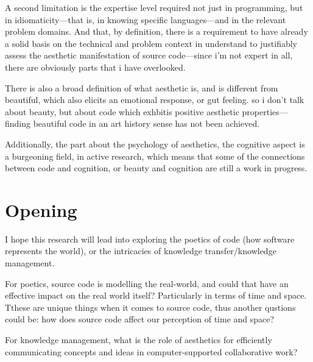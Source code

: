 A second limitation is the expertise level required not just in programming, but in idiomaticity—that is, in knowing specific languages—and in the relevant problem domains. And that, by definition, there is a requirement to have already a solid basis on the technical and problem context in understand to justifiably assess the aesthetic manifestation of source code—since i'm not expert in all, there are obviously parts that i have overlooked.

There is also a broad definition of what aesthetic is, and is different from beautiful, which also elicits an emotional response, or gut feeling. so i don't talk about beauty, but about code which exhbitis positive aesthetic properties—finding beautiful code in an art history sense has not been achieved.

Additionally, the part about the psychology of aesthetics, the cognitive aspect is a burgeoning field, in active research, which means that some of the connections between code and cognition, or beauty and cognition are still a work in progress.


\section{Opening} %

I hope this research will lead into exploring the poetics of code (how software represents the world), or the intricacies of knowledge transfer/knowledge management.

For poetics, source code is modelling the real-world, and could that have an effective impact on the real world itself? Particularly in terms of  time and space. Tthese are unique things when it comes to source code, thus another qustions could be: how does source code affect our perception of time and space?

For knowledge management, what is the role of aesthetics for efficiently communicating concepts and ideas in computer-supported collaborative work?